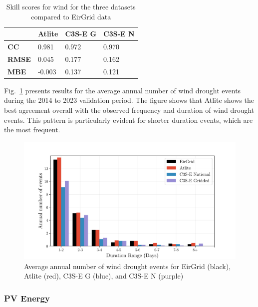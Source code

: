\documentclass[a4paper, 11pt]{article}
\begin{document}
\begin{table}[!ht]
	\centering
	\begin{tabular}{l|lll|}
		\cline{2-4}
		& \textbf{Atlite} & \textbf{C3S-E G} & \textbf{C3S-E N} \\ \hline
		\multicolumn{1}{|l|}{\textbf{CC}}   & 0.981           & 0.972            & 0.970            \\ \hline
		\multicolumn{1}{|l|}{\textbf{RMSE}} & 0.045           & 0.177            & 0.162            \\ \hline
		\multicolumn{1}{|l|}{\textbf{MBE}}   & -0.003          & 0.137            & 0.121            \\ \hline
	\end{tabular}
	\caption{Skill scores for wind for the three datasets compared to EirGrid data}
	\label{tab:wind_skill_scores}
\end{table}

Fig.~\ref{fig:bar_number_events_verification_wind} presents results for the average annual number of wind drought events during the 2014 to 2023 validation period. The figure shows that Atlite shows the best agreement overall with the observed frequency and duration of wind drought events. This pattern is particularly evident for shorter duration events, which are the most frequent.

\begin{figure}[!ht]
	\centering
	\includegraphics[width=\textwidth]{verification_wind_bar}
	\caption{Average annual number of wind drought events for EirGrid (black), Atlite (red), C3S-E G (blue), and C3S-E N (purple)}
	\label{fig:bar_number_events_verification_wind}
\end{figure}

\newpage
\subsubsection{PV Energy}
\label{sec:pv_verification}
\end{document}
